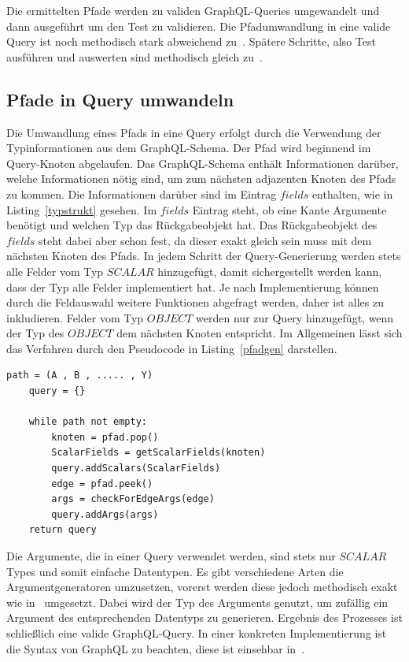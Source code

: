 Die ermittelten Pfade werden zu validen GraphQL-Queries umgewandelt und dann ausgeführt um den Test zu validieren.
Die Pfadumwandlung in eine valide Query ist noch methodisch stark abweichend zu~\cite{property-based-testing}.
Spätere Schritte, also Test ausführen und auswerten sind methodisch gleich zu~\cite{property-based-testing}.

\subsection{Pfade in Query umwandeln}
\label{pfadquery}

Die Umwandlung eines Pfads in eine Query erfolgt durch die Verwendung der Typinformationen aus dem GraphQL-Schema.
Der Pfad wird beginnend im Query-Knoten abgelaufen.
Das GraphQL-Schema enthält Informationen darüber, welche Informationen nötig sind, um zum nächsten adjazenten Knoten des Pfads zu kommen.
Die Informationen darüber sind im Eintrag $fields$ enthalten, wie in Listing~\ref{typstrukt} gesehen.
Im $fields$ Eintrag steht, ob eine Kante Argumente benötigt und welchen Typ das Rückgabeobjekt hat.
Das Rückgabeobjekt des $fields$ steht dabei aber schon fest, da dieser exakt gleich sein muss mit dem nächsten Knoten des Pfads.
In jedem Schritt der Query-Generierung werden stets alle Felder vom Typ $SCALAR$ hinzugefügt, damit sichergestellt werden kann, dass
der Typ alle Felder implementiert hat.
Je nach Implementierung können durch die Feldauswahl weitere Funktionen abgefragt werden, daher ist alles zu inkludieren.
Felder vom Typ $OBJECT$ werden nur zur Query hinzugefügt, wenn der Typ des $OBJECT$ dem nächsten Knoten entspricht.
Im Allgemeinen lässt sich das Verfahren durch den Pseudocode in Listing~\ref{pfadgen} darstellen. \\

\begin{lstlisting}[caption={Pseudocode für Pfadgenerierung},captionpos=b, label={pfadgen}]
    path = (A , B , ..... , Y)
    query = {}

    while path not empty:
        knoten = pfad.pop()
        ScalarFields = getScalarFields(knoten)
        query.addScalars(ScalarFields)
        edge = pfad.peek()
        args = checkForEdgeArgs(edge)
        query.addArgs(args)
    return query
\end{lstlisting}

Die Argumente, die in einer Query verwendet werden, sind stets nur $SCALAR$ Types und somit einfache Datentypen.
Es gibt verschiedene Arten die Argumentgeneratoren umzusetzen, vorerst werden diese jedoch methodisch exakt wie in~\cite{property-based-testing} umgesetzt.
Dabei wird der Typ des Arguments genutzt, um zufällig ein Argument des entsprechenden Datentyps zu generieren.
Ergebnis des Prozesses ist schließlich eine valide GraphQL-Query.
In einer konkreten Implementierung ist die Syntax von GraphQL zu beachten, diese ist einsehbar in~\cite[2.3 Language Operations]{graphqlspecification}.

